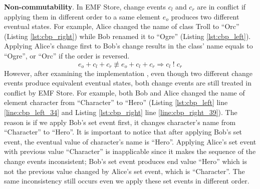 \textbf{Non-commutability}. In EMF Store, change events $c_{l}$ and $c_{r}$ are in conflict if applying them in different order to a same element $e_{o}$ produces two different eventual states. For example, Alice changed the \textsf{name} of class \textsf{Troll} to ``Orc'' (Listing \ref{lst:cbp_right}) while Bob renamed it to ``Ogre'' (Listing \ref{lst:cbp_left}). Applying Alice's change first to Bob's change results in the class' \textsf{name} equals to ``Ogre'', or ``Orc'' if the order is reversed.
\begin{equation} \label{eq:change_noncommutability}
e_{o} + c_{l} + c_{r} \not\equiv e_{o} + c_{l} + c_{r} \Rightarrow c_{l}\;!\;c_{r}
\end{equation}  
However, after examining the implementation \cite{eclipse2019emfstore}, even though two different change events produce equivalent eventual states, both change events are still treated in conflict by EMF Store. For example, both Bob and Alice changed the \textsf{name} of element \textsf{character} from ``Character'' to ``Hero'' (Listing \ref{lst:cbp_left} line \ref{line:cbp_left_34} and Listing \ref{lst:cbp_right} line \ref{line:cbp_right_39}). The reason is if we apply Bob's set event first, it changes \textsf{character}'s \textsf{name} from ``Character'' to ``Hero''. It is important to notice that after applying Bob's set event, the eventual value of \textsf{character}'s \textsf{name} is ``Hero''. Applying Alice's set event with previous value ``Character'' is inapplicable since it makes the sequence of the change events inconsistent; Bob's set event produces end value ``Hero'' which is not the previous value changed by Alice's set event, which is ``Character''. The same inconsistency still occurs even we apply these set events in different order.

